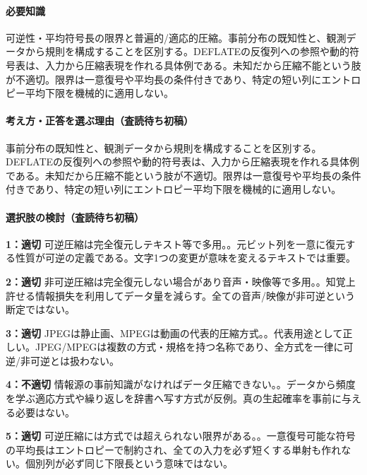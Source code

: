 \paragraph{必要知識} 可逆性・平均符号長の限界と普遍的/適応的圧縮。事前分布の既知性と、観測データから規則を構成することを区別する。DEFLATEの反復列への参照や動的符号表は、入力から圧縮表現を作れる具体例である。未知だから圧縮不能という肢が不適切。限界は一意復号や平均長の条件付きであり、特定の短い列にエントロピー平均下限を機械的に適用しない。

\paragraph{考え方・正答を選ぶ理由（査読待ち初稿）} 事前分布の既知性と、観測データから規則を構成することを区別する。DEFLATEの反復列への参照や動的符号表は、入力から圧縮表現を作れる具体例である。未知だから圧縮不能という肢が不適切。限界は一意復号や平均長の条件付きであり、特定の短い列にエントロピー平均下限を機械的に適用しない。

\paragraph{選択肢の検討（査読待ち初稿）}\mbox{}\par

\noindent\textbf{1：適切} 可逆圧縮は完全復元しテキスト等で多用。。元ビット列を一意に復元する性質が可逆の定義である。文字1つの変更が意味を変えるテキストでは重要。\par

\noindent\textbf{2：適切} 非可逆圧縮は完全復元しない場合があり音声・映像等で多用。。知覚上許せる情報損失を利用してデータ量を減らす。全ての音声/映像が非可逆という断定ではない。\par

\noindent\textbf{3：適切} JPEGは静止画、MPEGは動画の代表的圧縮方式。。代表用途として正しい。JPEG/MPEGは複数の方式・規格を持つ名称であり、全方式を一律に可逆/非可逆とは扱わない。\par

\noindent\textbf{4：不適切} 情報源の事前知識がなければデータ圧縮できない。。データから頻度を学ぶ適応方式や繰り返しを辞書へ写す方式が反例。真の生起確率を事前に与える必要はない。\par

\noindent\textbf{5：適切} 可逆圧縮には方式では超えられない限界がある。。一意復号可能な符号の平均長はエントロピーで制約され、全ての入力を必ず短くする単射も作れない。個別列が必ず同じ下限長という意味ではない。\par

